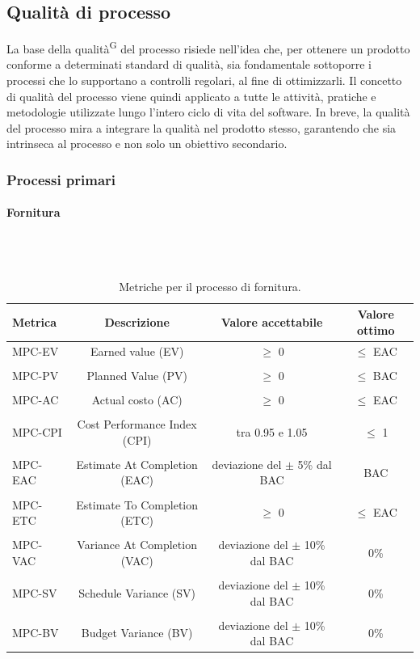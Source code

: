 \documentclass[8pt]{article}
\newcommand{\glossterm}[1]{#1\textsuperscript{G}} %
\newcommand{\subsubsubsection}[1]{\paragraph{#1}\mbox{}\\\\}
\begin{document}
\subsection{Qualità di processo}
La base della \glossterm{qualità} del processo risiede nell'idea che, per ottenere un prodotto conforme a determinati standard di qualità, sia fondamentale sottoporre i processi che lo supportano a controlli regolari, al fine di ottimizzarli. Il concetto di qualità del processo viene quindi applicato a tutte le attività, pratiche e metodologie utilizzate lungo l'intero ciclo di vita del software. In breve, la qualità del processo mira a integrare la qualità nel prodotto stesso, garantendo che sia intrinseca al processo e non solo un obiettivo secondario.
\subsubsection{Processi primari}
\subsubsubsection{Fornitura} 
\begin{table}[h]	
	\centering
	\begin{tabular}{lccc}
		\toprule
		\textbf{Metrica}& \textbf{Descrizione} & \textbf{Valore accettabile} & \textbf{Valore ottimo} \\
		\midrule
		MPC-EV & Earned value (EV) & $\geq$ 0 & $\leq$ EAC \\\\
		MPC-PV & Planned Value (PV) & $\geq$ 0 & $\leq$ BAC\\\\
		MPC-AC & Actual costo (AC) & $\geq$ 0 & $\leq$ EAC\\\\
		MPC-CPI & Cost Performance Index (CPI) & tra 0.95 e 1.05 & $\leq$ 1\\\\
		MPC-EAC & Estimate At Completion (EAC) & deviazione del $\pm$ 5\% dal BAC & BAC\\\\
		MPC-ETC & Estimate To Completion (ETC) & $\geq $ 0 & $\leq$ EAC\\\\
		MPC-VAC & Variance At Completion (VAC) & deviazione del $\pm$ 10\% dal BAC & 0\%\\\\
		MPC-SV & Schedule Variance (SV) & deviazione del $\pm$ 10\% dal BAC & 0\%\\\\
		MPC-BV & Budget Variance (BV) & deviazione del $\pm$ 10\% dal BAC  & 0\%\\
		\bottomrule
	\end{tabular}
	\caption{Metriche per il processo di fornitura.}
	\label{table:Tabella metriche per il processo di fornitura.}
\end{table}
\end{document}
